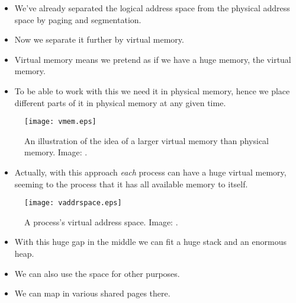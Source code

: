 \documentclass{beamer}
\begin{document}
\begin{frame}{\insertsubsectionhead}
  \begin{itemize}
    \item We've already separated the logical address space from the physical 
      address space by paging and segmentation.

    \item Now we separate it further by virtual memory.

    \item Virtual memory means we pretend as if we have a huge memory, the 
      virtual memory.

    \item To be able to work with this we need it in physical memory, hence we 
      place different parts of it in physical memory at any given time.

  \end{itemize}
\end{frame}

\begin{frame}{\insertsubsectionhead}
  \begin{figure}
    \texttt{[image: vmem.eps]}
    \caption{An illustration of the idea of a larger virtual memory than 
      physical memory.
      Image: \cite{Silberschatz2013osc}.}
  \end{figure}
\end{frame}

\begin{frame}{\insertsubsectionhead}
  \begin{itemize}
    \item Actually, with this approach \emph{each} process can have a huge 
      virtual memory, seeming to the process that it has all available memory 
      to itself.
  \end{itemize}
\end{frame}

\begin{frame}{\insertsubsectionhead}
  \begin{figure}
    \texttt{[image: vaddrspace.eps]}
    \caption{A process's virtual address space.
      Image: \cite{Silberschatz2013osc}.}
  \end{figure}
\end{frame}

\begin{frame}{\insertsubsectionhead}
  \begin{itemize}
    \item With this huge gap in the middle we can fit a huge stack and an 
      enormous heap.

    \item We can also use the space for other purposes.

    \item We can map in various shared pages there.

  \end{itemize}
\end{frame}
\end{document}
